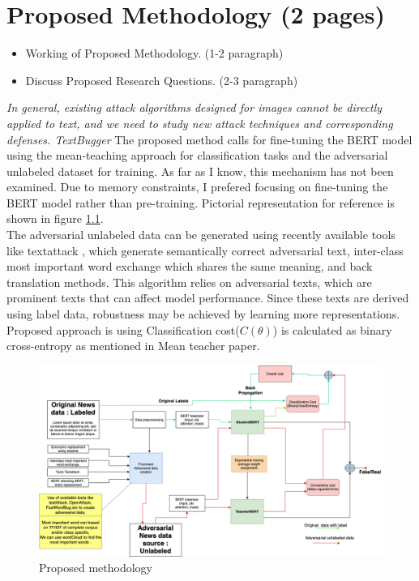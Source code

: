 \documentclass[%
	BCOR=8mm, %
	DIV=12, 
	toc=bibliography, %
	toc=listof, %
	oneside, %
	egregdoesnotlikesansseriftitles, %
	]{scrbook}
\begin{document}
\chapter{Proposed Methodology (2 pages)}
\begin{itemize}
\item Working of Proposed Methodology. (1-2 paragraph)
\item Discuss Proposed Research Questions. (2-3 paragraph)
\end{itemize}
\textit{In general, existing attack algorithms designed for images cannot be directly applied to text, and we need to study new attack techniques and corresponding defenses. TextBugger}
The proposed method calls for fine-tuning the BERT model using the mean-teaching approach for classification tasks and the adversarial unlabeled dataset for training. As far as I know, this mechanism has not been examined. Due to memory constraints, I prefered focusing on fine-tuning the BERT model rather than pre-training. Pictorial representation for reference is shown in figure \ref{diag:advMTBERT}.\\
The adversarial unlabeled data can be generated using recently available tools like textattack \cite{morris_textattack_2020}, which generate semantically correct adversarial text, inter-class most important word exchange which shares the same meaning, and back translation methods. This algorithm relies on adversarial texts, which are prominent texts that can  affect model performance. Since these texts are derived using label data,  robustness may be achieved by learning more representations.\\
Proposed approach is using Classification cost($C(\theta)$) is calculated as binary cross-entropy as mentioned in Mean teacher paper. 
\begin{figure}[h!]
\centering
\includegraphics[width=1.1\textwidth]{img/Methodology.png}
\caption{Proposed methodology }
\label{diag:advMTBERT}
\end{figure}
\end{document}
